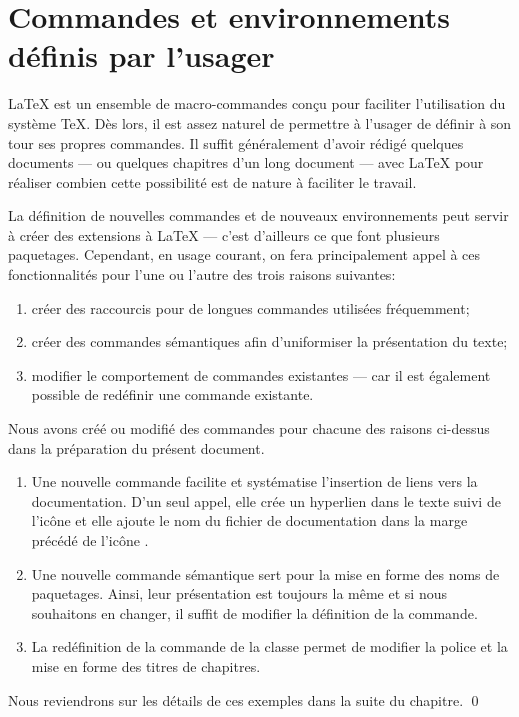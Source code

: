 \chapter{Commandes et environnements définis par l'usager}
\label{chap:commandes}

{\LaTeX} est un ensemble de macro-commandes conçu pour faciliter
l'utilisation du système {\TeX}. Dès lors, il est assez naturel de
permettre à l'usager de définir à son tour ses propres commandes. Il
suffit généralement d'avoir rédigé quelques documents --- ou quelques
chapitres d'un long document --- avec {\LaTeX} pour réaliser combien
cette possibilité est de nature à faciliter le travail.

La définition de nouvelles commandes et de nouveaux environnements
peut servir à créer des extensions à {\LaTeX} --- c'est d'ailleurs ce
que font plusieurs paquetages. Cependant, en usage courant, on fera
principalement appel à ces fonctionnalités pour l'une ou l'autre des
trois raisons suivantes:

\begin{enumerate}
\item créer des raccourcis pour de longues commandes utilisées
  fréquemment;
\item créer des commandes sémantiques afin d'uniformiser la
  présentation du texte;
\item modifier le comportement de commandes existantes --- car il est
  également possible de redéfinir une commande existante.
\end{enumerate}

\begin{exemple}
  \label{ex:commandes:intro}
  Nous avons créé ou modifié des commandes pour chacune des raisons
  ci-dessus dans la préparation du présent document.
  \begin{enumerate}
  \item Une nouvelle commande \cmdprint{\doc} facilite et systématise
    l'insertion de liens vers la documentation. D'un seul appel, elle
    crée un hyperlien dans le texte suivi de l'icône {\faExternalLink}
    et elle ajoute le nom du fichier de documentation dans la marge
    précédé de l'icône {\faBookmark}.
  \item Une nouvelle commande sémantique \cmdprint{\pkg} sert pour la
    mise en forme des noms de paquetages. Ainsi, leur présentation est
    toujours la même et si nous souhaitons en changer, il suffit de
    modifier la définition de la commande.
  \item La redéfinition de la commande \cmd{\chaptitlefont} de la
    classe  permet de modifier la police et la mise en
    forme des titres de chapitres.
  \end{enumerate}
  Nous reviendrons sur les détails de ces exemples dans la suite du
  chapitre. %
  \qed
\end{exemple}


